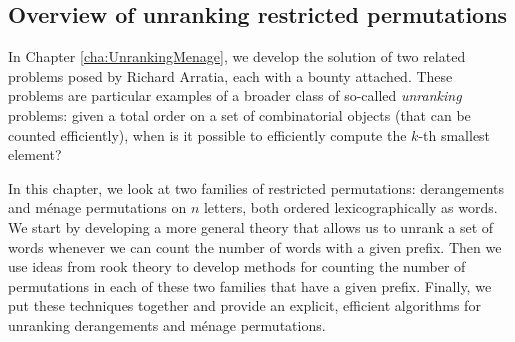 \subsection{Overview of unranking restricted permutations}
In Chapter \ref{cha:UnrankingMenage}, we develop the solution of two related
problems posed by Richard Arratia, each with a bounty attached.
These problems are particular examples of a broader class of so-called
\textit{unranking} problems:
given a total order on a set of combinatorial objects (that can be counted
efficiently), when is it possible to efficiently compute the $k$-th smallest
element?

In this chapter, we look at two families of restricted permutations:
derangements and m\'enage permutations on $n$ letters, both ordered
lexicographically as words.
We start by developing a more general theory that allows us to unrank a set
of words whenever we can count the number of words with a given prefix.
Then we use ideas from rook theory to develop methods for counting the number
of permutations in each of these two families that have a given prefix.
Finally, we put these techniques together and provide an explicit, efficient
algorithms for unranking derangements and m\'enage permutations.

